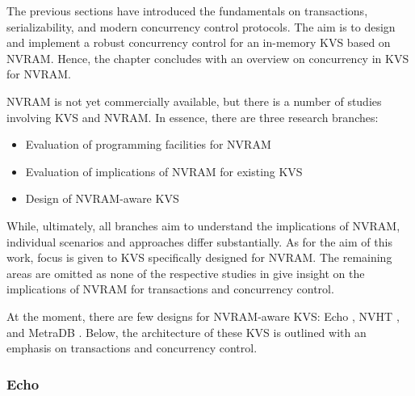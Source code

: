 The previous sections have introduced the fundamentals on transactions,
serializability, and modern concurrency control protocols. The aim is to design
and implement a robust concurrency control for an in-memory KVS based on NVRAM.
Hence, the chapter concludes with an overview on concurrency in KVS for NVRAM.

NVRAM is not yet commercially available, but there is a number of studies
involving KVS and NVRAM. In essence, there are three research branches:

\begin{itemize}
    \item Evaluation of programming facilities for NVRAM
    \item Evaluation of implications of NVRAM for existing KVS
    \item Design of NVRAM-aware KVS
\end{itemize}

While, ultimately, all branches aim to understand the implications of NVRAM,
individual scenarios and approaches differ substantially. As for the aim of this
work, focus is given to KVS specifically designed for NVRAM. The remaining areas
are omitted as none of the respective studies in
\cite{venkataraman2011consistent, pelley2013storage, volos2014aerie,
lersch2017analysis, malinowski2017using} give insight on the implications of
NVRAM for transactions and concurrency control.

At the moment, there are few designs for NVRAM-aware KVS: Echo
\cite{bailey2013exploring}, NVHT \cite{zhou2016nvht}, and MetraDB
\cite{marmol2016nonvolatile}. Below, the architecture of these KVS is outlined
with an emphasis on transactions and concurrency control.

\subsubsection{Echo}

